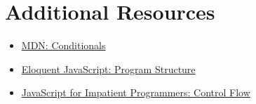 \section{Additional Resources}

\begin{itemize}[leftmargin=*]
    \item \href{https://developer.mozilla.org/en-US/docs/Learn/JavaScript/Building_blocks/conditionals}{MDN: Conditionals}
    \item \href{https://eloquentjavascript.net/02_program_structure.html}{Eloquent JavaScript: Program Structure}
    \item \href{http://exploringjs.com/impatient-js/ch_control-flow.html}{JavaScript for Impatient Programmers: Control Flow}
\end{itemize}
